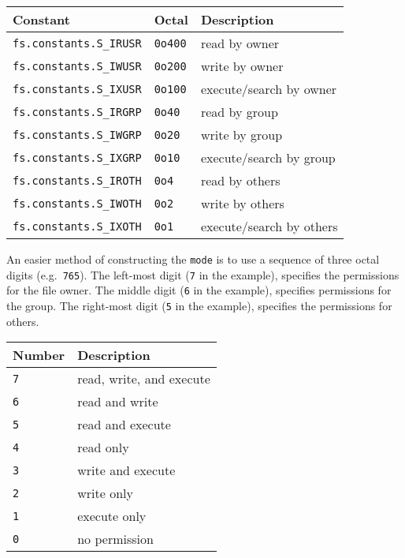 \begin{longtable}[]{@{}lll@{}}
\toprule\noalign{}
Constant & Octal & Description \\
\midrule\noalign{}
\endhead
\bottomrule\noalign{}
\endlastfoot
\texttt{fs.constants.S\_IRUSR} & \texttt{0o400} & read by owner \\
\texttt{fs.constants.S\_IWUSR} & \texttt{0o200} & write by owner \\
\texttt{fs.constants.S\_IXUSR} & \texttt{0o100} & execute/search by
owner \\
\texttt{fs.constants.S\_IRGRP} & \texttt{0o40} & read by group \\
\texttt{fs.constants.S\_IWGRP} & \texttt{0o20} & write by group \\
\texttt{fs.constants.S\_IXGRP} & \texttt{0o10} & execute/search by
group \\
\texttt{fs.constants.S\_IROTH} & \texttt{0o4} & read by others \\
\texttt{fs.constants.S\_IWOTH} & \texttt{0o2} & write by others \\
\texttt{fs.constants.S\_IXOTH} & \texttt{0o1} & execute/search by
others \\
\end{longtable}

An easier method of constructing the \texttt{mode} is to use a sequence
of three octal digits (e.g.~\texttt{765}). The left-most digit
(\texttt{7} in the example), specifies the permissions for the file
owner. The middle digit (\texttt{6} in the example), specifies
permissions for the group. The right-most digit (\texttt{5} in the
example), specifies the permissions for others.

\begin{longtable}[]{@{}ll@{}}
\toprule\noalign{}
Number & Description \\
\midrule\noalign{}
\endhead
\bottomrule\noalign{}
\endlastfoot
\texttt{7} & read, write, and execute \\
\texttt{6} & read and write \\
\texttt{5} & read and execute \\
\texttt{4} & read only \\
\texttt{3} & write and execute \\
\texttt{2} & write only \\
\texttt{1} & execute only \\
\texttt{0} & no permission \\
\end{longtable}

